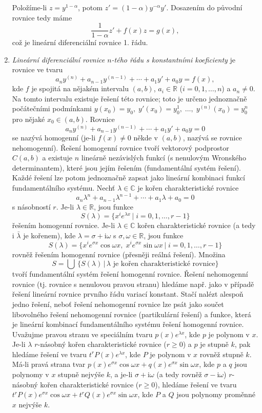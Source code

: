 \begin{enumerate}
\[   \]
   Položíme-li $z=y^{1-\alpha}$, potom $z'=(1-\alpha)y^{-\alpha}y'$.
   Dosazením do původní rovnice tedy máme
   \[
      \frac{1}{1-\alpha}z' + f(x)z = g(x),
   \]
   což je lineární diferenciální rovnice 1. řádu.
   \item \emph{Lineární diferenciální rovnice $n$-tého řádu s konstantními koeficienty}
   je rovnice ve tvaru
   \[
      a_ny^{(n)}+a_{n-1}y^{(n-1)}+\cdots+a_1y'+a_0y = f(x),
   \]
   kde $f$ je spojitá na nějakém intervalu $(a,b)$, $a_i\in\mathbb{R}$ ($i=0,1,\ldots,n$) a $a_n\neq 0$.
   Na tomto intervalu existuje řešení této rovnice;
   toto je určeno jednoznačně počátečními podmínkami
   $y(x_0)=y_0, \; y'(x_0)=y_0^{1},\; \ldots, \; y^{(n)}(x_0)=y_0^{n}$
   pro nějaké $x_0\in(a,b)$. 
   Rovnice
   \[
      a_ny^{(n)}+a_{n-1}y^{(n-1)}+\cdots+a_1y'+a_0y = 0
   \]
   se nazývá homogenní (je-li $f(x)\neq 0$ někde v $(a,b)$, nazývá se rovnice nehomogenní).
   Řešení homogenní rovnice tvoří vektorový podprostor $C(a,b)$
   a existuje $n$ lineárně nezávislých funkcí (s nenulovým Wronského determinantem), 
   které jsou jejím řešením (fundamentální systém řešení).
   Každé řešení lze potom jednoznačně zapsat jako lineární kombinaci funkcí fundamentálního systému.
   Nechť $\lambda\in\mathbb{C}$ je kořen charakteristické rovnice
   \[
       a_n\lambda^n+a_{n-1}\lambda^{n-1}+\cdots+a_1\lambda+a_0 = 0
   \]
   s násobností $r$.
   Je-li $\lambda\in\mathbb{R}$, jsou funkce
   \[
      S(\lambda)=\{x^ie^{\lambda x}\,| \; i=0,1,\ldots,r-1\}
   \]
   řešením homogenní rovnice.
   Je-li $\lambda\in\mathbb{C}$ kořen charakteristické rovnice
   (a tedy i $\bar{\lambda}$ je kořenem), kde $\lambda=\sigma+\mathrm{i}\omega$ s $\sigma,\omega\in\mathbb{R}$, 
   jsou funkce
   \[
      S(\lambda)=\{x^ie^{\sigma x}\cos\omega x,\;x^ie^{\sigma x}\sin\omega x\,|\;i=0,1,\ldots,r-1\}
   \]
   rovněž řešením homogenní rovnice (přesněji reálná řešení).
   Množina
   \[
      S = \bigcup\,\{S(\lambda)\,|\,\lambda\text{ je kořen charakteristické rovnice}\}
   \]
   tvoří fundamentální systém řešení homogenní rovnice.
   Řešení nehomogenní rovnice (tj. rovnice s nenulovou pravou stranu) hledáme
   např. jako v případě řešení lineární rovnice prvního řádu variací konstant. 
   Stačí nalézt alespoň jedno řešení, neboť řešení nehomogenní rovnice lze psát
   jako součet libovolného řešení nehomogenní rovnice (partikulární řešení)
   a funkce, která je lineární kombinací fundamentálního systému řešení homogenní rovnice. 
   Uvažujme pravou stranu ve speciálním tvaru $p(x)e^{\lambda x}$,
   kde $p$ je polynom v $x$. Je-li $\lambda$ $r$-násobný kořen charakteristické rovnice ($r\geq 0$)
   a $p$ je stupně $k$, pak hledáme řešení ve tvaru $t^rP(x)e^{\lambda x}$,
   kde $P$ je polynom v $x$ rovněž stupně $k$.
   Má-li pravá strana tvar $p(x)e^{\sigma x}\cos\omega x+q(x)e^{\sigma x}\sin\omega x$,
   kde $p$ a $q$ jsou polynomy v $x$ stupně nejvýše $k$,
   a je-li $\sigma+\mathrm{i}\omega$ (a tedy rovněž $\sigma-\mathrm{i}\omega$)
   $r$-násobný kořen charakteristické rovnice ($r\geq 0$),
   hledáme řešení ve tvaru $t^rP(x)e^{\sigma x}\cos\omega x+t^rQ(x)e^{\sigma x}\sin\omega x$,
   kde $P$ a $Q$ jsou polynomy proměnné $x$ nejvýše $k$.
\end{enumerate}

